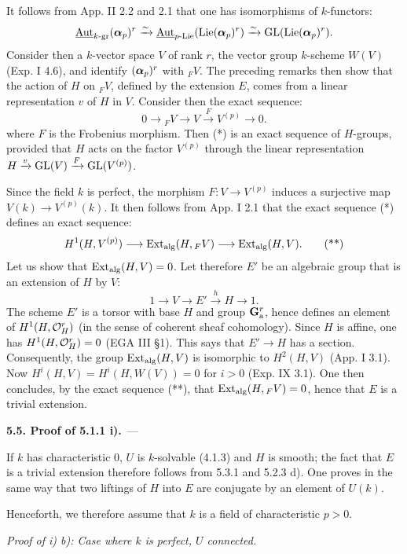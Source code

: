 It follows from App. II 2.2 and 2.1 that one has isomorphisms of $k$-functors:
\[
 \underline{\operatorname{Aut}}_{k\text{-gr}}(\boldsymbol{\alpha}_p)^r\xrightarrow{\sim}
 \underline{\operatorname{Aut}}_{p\text{-Lie}}(\operatorname{Lie}(\boldsymbol{\alpha}_p)^r)\xrightarrow{\sim}
 \operatorname{GL}(\operatorname{Lie}(\boldsymbol{\alpha}_p)^r).
\]
Consider then a $k$-vector space $V$ of rank $r$, the vector group $k$-scheme $W(V)$ (Exp. I 4.6), and identify $(\boldsymbol{\alpha}_p)^r$ with ${}_FV$. The preceding remarks then show that the action of $H$ on ${}_FV$, defined by the extension $E$, comes from a linear representation $v$ of $H$ in $V$. Consider then the exact sequence:
\[
 0\to {}_FV\to V\xrightarrow{F}V^{(p)}\to0.\tag{*}
\]
where $F$ is the Frobenius morphism. Then (*) is an exact sequence of $H$-groups, provided that $H$ acts on the factor $V^{(p)}$ through the linear representation $H\xrightarrow{v}\operatorname{GL}(V)\xrightarrow{F}\operatorname{GL}(V^{(p)})$.

Since the field $k$ is perfect, the morphism $F:V\to V^{(p)}$ induces a surjective map $V(k)\to V^{(p)}(k)$. It then follows from App. I 2.1 that the exact sequence (*) defines an exact sequence:
\[
 H^1(H,V^{(p)})\longrightarrow\operatorname{Ext}_{\mathrm{alg}}(H,{}_FV)\longrightarrow\operatorname{Ext}_{\mathrm{alg}}(H,V).\tag{**}
\]
Let us show that $\operatorname{Ext}_{\mathrm{alg}}(H,V)=0$. Let therefore $E'$ be an algebraic group that is an extension of $H$ by $V$:
\[
 1\to V\to E'\xrightarrow{h}H\to1.
\]
The scheme $E'$ is a torsor with base $H$ and group $\mathbf{G}_{\mathrm{a}}^r$, hence defines an element of $H^1(H,\mathcal{O}_H^r)$ (in the sense of coherent sheaf cohomology). Since $H$ is affine, one has $H^1(H,\mathcal{O}_H^r)=0$ (EGA III \S1). This says that $E'\to H$ has a section. Consequently, the group $\operatorname{Ext}_{\mathrm{alg}}(H,V)$ is isomorphic to $H^2(H,V)$ (App. I 3.1). Now $H^i(H,V)=H^i(H,W(V))=0$ for $i>0$ (Exp. IX 3.1). One then concludes, by the exact sequence (**), that $\operatorname{Ext}_{\mathrm{alg}}(H,{}_FV)=0$, hence that $E$ is a trivial extension.

\par\medskip\noindent\textbf{5.5. Proof of 5.1.1 i).}\ ---\par\label{XVII.5.5}
If $k$ has characteristic $0$, $U$ is $k$-solvable (4.1.3) and $H$ is smooth; the fact that $E$ is a trivial extension therefore follows from 5.3.1 and 5.2.3 d). One proves in the same way that two liftings of $H$ into $E$ are conjugate by an element of $U(k)$.

Henceforth, we therefore assume that $k$ is a field of characteristic $p>0$.

\noindent\emph{Proof of i) b): Case where $k$ is perfect, $U$ connected.}

